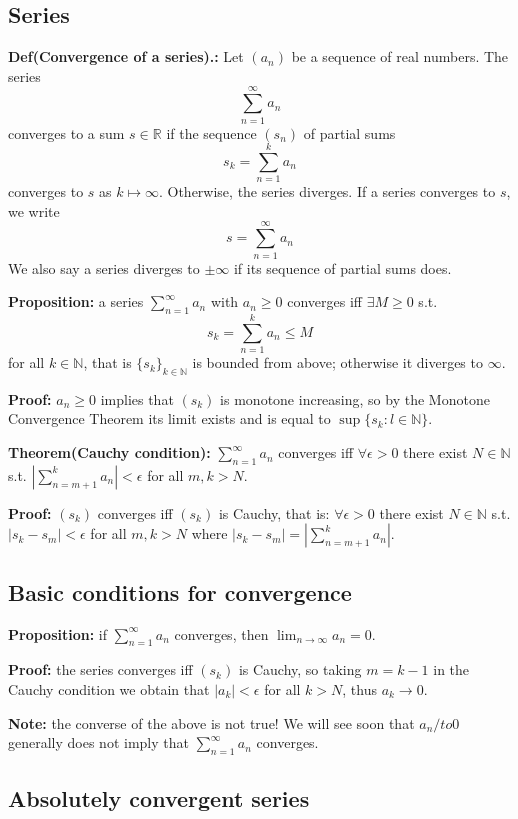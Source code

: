 \documentclass{article}
\begin{document}
\subsection{Series}

\textbf{Def(Convergence of a series).:} Let $(a_n)$ be a sequence of real numbers. The series
\[
\sum^{\infty}_{n=1}{a_n}
\]
converges to a sum $s\in \mathbb{R}$ if the sequence $(s_n)$ of partial sums
\[
s_k=\sum_{n=1}^{k}{a_n}
\]
converges to $s$ as $k\mapsto \infty$. Otherwise, the series diverges. If a series 
converges to $s$, we write 
\[
s=\sum_{n=1}^{\infty}{a_n}
\]
We also say a series diverges to $\pm \infty$ if its sequence of partial sums does.

\textbf{Proposition:} a series $\sum_{n=1}^{\infty}{a_n}$  with $a_n\geq 0$ converges iff $\exists M\geq 0$ s.t.
\[
s_k=\sum_{n=1}^{k}{a_n}\leq M
\]
for all $k\in \mathbb{N}$, that is $\{s_k\}_{k\in \mathbb{N}}$ is bounded from above; otherwise it 
diverges to $\infty$.

\textbf{Proof:} $a_n\geq 0$ implies that $(s_k)$ is monotone increasing, so by the Monotone Convergence Theorem its limit exists and is equal to $\sup \{s_k:l\in \mathbb{N}\}$.

\textbf{Theorem(Cauchy condition):} $\sum_{n=1}^{\infty}{a_n}$ converges iff $\forall \epsilon>0$ there exist $N\in \mathbb{N}$ s.t. $|\sum_{n=m+1}^{k}{a_n}| < \epsilon$ for all $m,k>N$.

\textbf{Proof:} $(s_k)$ converges iff $(s_k)$ is Cauchy, that is: $\forall \epsilon > 0$ there exist $N\in \mathbb{N}$ s.t. $|s_k-s_m|<\epsilon$ for all $m,k>N$ where $|s_k-s_m|=|\sum_{n=m+1}^{k}{a_n}|$.

\subsection{Basic conditions for convergence}

\textbf{Proposition:} if $\sum_{n=1}^{\infty}{a_n}$ converges, then $\lim_{n\to \infty}a_n=0$.

\textbf{Proof:} the series converges iff $(s_k)$ is Cauchy, so taking $m=k-1$ in the Cauchy condition we obtain that $|a_k|<\epsilon$ for all $k>N$, thus $a_k\to 0$.

\textbf{Note:} the converse of the above is not true! We will see soon that $a_n/to 0$ generally does not imply that $\sum_{n=1}^{\infty}{a_n}$ converges.

\subsection{Absolutely convergent series}
\end{document}
